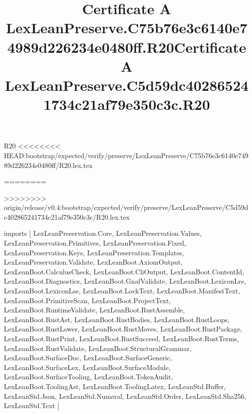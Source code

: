 \begin{lexlean}{R20}
<<<<<<<< HEAD:bootstrap/expected/verify/preserve/LexLeanPreserve/C75b76e3c6140e74989d226234e0480ff/R20.lex.tex
\title{Certificate A LexLeanPreserve.C75b76e3c6140e74989d226234e0480ff.R20}
========
\title{Certificate A LexLeanPreserve.C5d59dc402865241734c21af79e350c3c.R20}
>>>>>>>> origin/release/v0.4:bootstrap/expected/verify/preserve/LexLeanPreserve/C5d59dc402865241734c21af79e350c3c/R20.lex.tex
\begin{coremodule}
imports [
  LexLeanPreservation.Core,
  LexLeanPreservation.Values,
  LexLeanPreservation.Primitives,
  LexLeanPreservation.Fixed,
  LexLeanPreservation.Keys,
  LexLeanPreservation.Templates,
  LexLeanPreservation.Validate,
  LexLeanBoot.AxiomOutput,
  LexLeanBoot.CalculusCheck,
  LexLeanBoot.CliOutput,
  LexLeanBoot.ContentId,
  LexLeanBoot.Diagnostics,
  LexLeanBoot.GnafValidate,
  LexLeanBoot.LexiconLre,
  LexLeanBoot.LexiconLse,
  LexLeanBoot.LockText,
  LexLeanBoot.ManifestText,
  LexLeanBoot.PrimitiveScan,
  LexLeanBoot.ProjectText,
  LexLeanBoot.RuntimeValidate,
  LexLeanBoot.RustAssemble,
  LexLeanBoot.RustAst,
  LexLeanBoot.RustBodies,
  LexLeanBoot.RustLoops,
  LexLeanBoot.RustLower,
  LexLeanBoot.RustMoves,
  LexLeanBoot.RustPackage,
  LexLeanBoot.RustPrint,
  LexLeanBoot.RustSucceed,
  LexLeanBoot.RustTerms,
  LexLeanBoot.RustValidate,
  LexLeanBoot.StructuralGrammar,
  LexLeanBoot.SurfaceDoc,
  LexLeanBoot.SurfaceGeneric,
  LexLeanBoot.SurfaceLex,
  LexLeanBoot.SurfaceModule,
  LexLeanBoot.SurfaceTooling,
  LexLeanBoot.TokenAudit,
  LexLeanBoot.ToolingAst,
  LexLeanBoot.ToolingLatex,
  LexLeanStd.Buffer,
  LexLeanStd.Json,
  LexLeanStd.Numeral,
  LexLeanStd.Order,
  LexLeanStd.Sha256,
  LexLeanStd.Text
]


\end{coremodule}
\end{lexlean}
